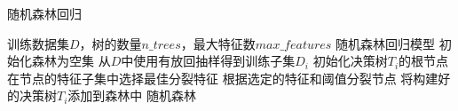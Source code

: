 \documentclass{article}
\begin{document}
	
	\begin{algorithm}
		\caption{随机森林回归}
		\begin{algorithmic}[1]
			\Require 训练数据集$D$，树的数量$n\_trees$，最大特征数$max\_features$
			\Ensure 随机森林回归模型
			\State 初始化森林为空集
			\State 从$D$中使用有放回抽样得到训练子集$D_i$
			\State 初始化决策树$T_i$的根节点
			\State 在节点的特征子集中选择最佳分裂特征
			\State 根据选定的特征和阈值分裂节点
			\EndWhile
			\State 将构建好的决策树$T_i$添加到森林中
			\EndFor
			\State \Return 随机森林
		\end{algorithmic}
	\end{algorithm}
	
\end{document}
